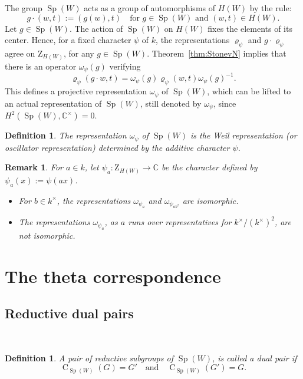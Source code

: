 \documentclass[12pt]{amsart}
\numberwithin{equation}{subsection}
\newtheorem{defn}[equation]{Definition}
\newtheorem{remark}[equation]{Remark}
\newcommand{\CC}{\mathbb{C}}
\newcommand{\Cent}{\operatorname{C}}
\newcommand{\rZ}{{\mathrm{Z}}}
\newcommand{\Sp}{\operatorname{Sp}}
\begin{document}
The group $\Sp(W)$ acts as a group of automorphisms of $H(W)$ by the rule:
\begin{equation}
g\cdot (w,t):=(g(w),t)\quad\text{for $g\in \Sp(W)$ and $(w,t)\in H(W)$}.
\end{equation}
Let $g\in \Sp(W)$. The action of $\Sp(W)$ on $H(W)$ fixes the elements of its center. Hence, for a fixed character $\psi$ of $k$, the representations $\varrho_\psi$ and $g\cdot \varrho_\psi$ agree on $\rZ_{H(W)}$, for any $g\in\Sp(W)$.  
Theorem~\ref{thm:StonevN} implies that there is an operator $\omega_\psi(g)$ verifying
\begin{equation} \label{eqn:Weil}
\varrho_\psi(g\cdot w,t) = \omega_\psi(g)\varrho_\psi(w,t)\omega_\psi(g)^{-1}.
\end{equation}
This defines a projective representation $\omega_\psi$ of $\Sp(W)$, which can be lifted to an actual representation of $\Sp(W)$, still denoted by $\omega_\psi$, since $H^2(\Sp(W),\CC^\times)=0$.

\begin{defn} \label{defn:Weil}
The representation $\omega_\psi$ of $\Sp(W)$ is the \textit{Weil representation} (or \textit{oscillator representation}) determined by the additive character $\psi$.
\end{defn}

\begin{remark} {\rm 
For $a\in k$, let $\psi_a\colon \rZ_{H(W)}\to\CC$ be the character  defined by $\psi_a(x):=\psi(ax)$. 
\begin{itemize}
\item 
For $b\in k^\times$, the representations $\omega_{\psi_a}$ and $\omega_{\psi_{ab^2}}$ are isomorphic. 
\item
The representations $\omega_{\psi_a}$, as $a$ runs over representatives for $k^\times/(k^\times)^2$, are not isomorphic.
\end{itemize}
}
\end {remark}

\section{The theta correspondence} \label{sec:theta}

\subsection{Reductive dual pairs}\

\begin{defn} {\rm
A pair of reductive subgroups of $\Sp(W)$,  is called  a \textit{dual pair} if 
\[\Cent_{\Sp(W)}(G)=G'\quad\text{and}\quad \Cent_{\Sp(W)}(G')=G.\]
}
\end{defn}
\end{document}
